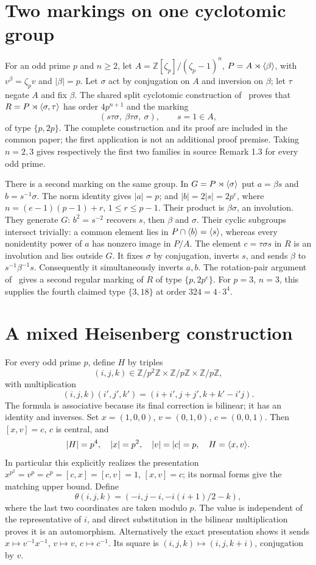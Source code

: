 \section{Two markings on one cyclotomic group}
For an odd prime $p$ and $n\geq2$, let $A=\mathbb Z[\zeta_p]/(\zeta_p-1)^n$,
$P=A\rtimes\langle \beta\rangle$, with $v^\beta=\zeta_pv$ and $|\beta|=p$.
Let $\sigma$ act by conjugation on $A$ and inversion on $\beta$;
let $\tau$ negate $A$ and fix $\beta$.
The shared split cyclotomic construction of~\cite{UF} proves that
$R=P\rtimes\langle \sigma,\tau\rangle$ has order $4p^{n+1}$ and the
marking
\[
(s\tau\sigma,\ \beta\tau\sigma,\ \sigma),\qquad s=1\in A,
\]
of type $\{p,2p\}$. The complete construction and its proof are included in the common
paper; the first application is not an additional proof premise. Taking $n=2,3$ gives respectively the first
two families in source Remark 1.3 for every odd prime.

There is a second marking on the same group. In
$G=P\rtimes\langle \sigma\rangle$ put $a=\beta s$ and $b=s^{-1}\sigma$.
The norm identity gives $|a|=p$; and $|b|=2|s|=2p^e$, where
$n=(e-1)(p-1)+r$, $1\leq r\leq p-1$.
Their product is $\beta\sigma$, an involution. They generate $G$:
$b^2=s^{-2}$ recovers $s$, then $\beta$ and $\sigma$.
Their cyclic subgroups intersect trivially: a common element lies
in $P\cap\langle b\rangle=\langle s\rangle$, whereas every nonidentity power of $a$
has nonzero image in $P/A$.
The element $c=\tau\sigma s$ in $R$ is an involution and lies
outside $G$. It fixes $\sigma$ by conjugation, inverts $s$, and
sends $\beta$ to $s^{-1}\beta^{-1}s$.
Consequently it simultaneously inverts $a,b$.
The rotation-pair argument of~\cite{UF} gives a second regular marking of
$R$ of type $\{p,2p^e\}$.
For $p=3$, $n=3$, this supplies the fourth claimed type
$\{3,18\}$ at order $324=4\cdot3^4$.

\section{A mixed Heisenberg construction}
For every odd prime $p$, define $H$ by triples
\[
(i,j,k)\in\mathbb Z/p^2\mathbb Z\times\mathbb Z/p\mathbb Z
                    \times\mathbb Z/p\mathbb Z,
\]
with multiplication
\[
(i,j,k)(i',j',k')=(i+i',j+j',k+k'-i'j).
\]
The formula is associative because its final correction is bilinear;
it has an identity and inverses. Set $x=(1,0,0)$, $v=(0,1,0)$,
$c=(0,0,1)$. Then $[x,v]=c$, $c$ is central, and
\[
|H|=p^4,\quad |x|=p^2,\quad |v|=|c|=p,
\quad H=\langle x,v\rangle.
\]
In particular this explicitly realizes the presentation
$x^{p^2}=v^p=c^p=[c,x]=[c,v]=1$, $[x,v]=c$;
its normal forms give the matching upper bound.
Define
\[
\theta(i,j,k)=(-i,j-i,-i(i+1)/2-k),
\]
where the last two coordinates are taken modulo $p$.
The value is independent of the representative of $i$, and direct
substitution in the bilinear multiplication proves it is an
automorphism. Alternatively the exact presentation shows it sends
$x\mapsto v^{-1}x^{-1}$, $v\mapsto v$, $c\mapsto c^{-1}$.
Its square is $(i,j,k)\mapsto(i,j,k+i)$, conjugation by $v$.

